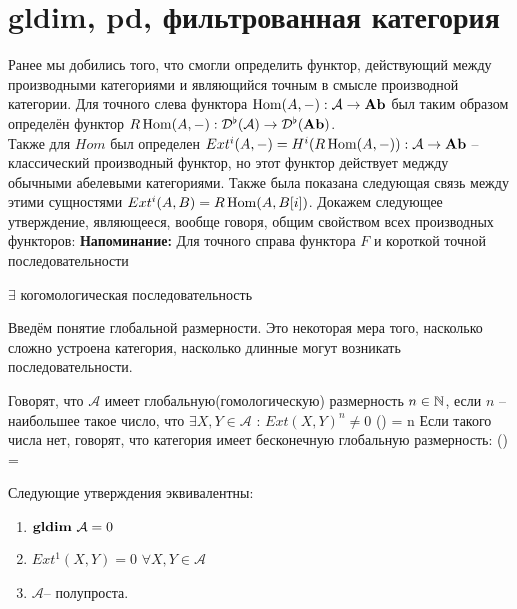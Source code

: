 \documentclass[../main.tex]{subfiles}
\begin{document}
\section{gldim, pd, фильтрованная категория}
Ранее мы добились того, что смогли определить функтор, действующий между производными категориями и являющийся точным в смысле производной категории. 
Для точного слева функтора $\operatorname{Hom}(A, -) : \mathcal{A} \rightarrow \mathbf{Ab}$ был таким образом определён функтор $R\operatorname{Hom}(A, -) : \mathcal{D^\flat (A)} \rightarrow \mathcal{D^\flat (\mathbf{Ab})}$.\\
Также для $Hom$ был определен $Ext^i(A, -) = H^i(R\operatorname{Hom}(A, -)) : \mathcal{A} \rightarrow \mathbf{Ab}$ -- классический производный функтор, но этот функтор действует меджду обычными абелевыми категориями. Также была показана следующая связь между этими сущностями $Ext^i(A, B) = R\operatorname{Hom}(A, B[i])$.
Докажем следующее утверждение, являющееся, вообще говоря, общим свойством всех производных функторов:
\textbf{Напоминание:} Для точного справа функтора $F$ и короткой точной последовательности  $\exists$ когомологическая последовательность 
Введём понятие глобальной размерности. Это некоторая мера того, насколько сложно устроена категория, насколько длинные могут возникать последовательности.
\begin{to_def}
\label{gld}
Говорят, что $\mathcal{A}$ имеет глобальную(гомологическую) размерность $n\in \mathbb{N}$, если $n$ -- наибольшее такое число, что $\exists X, Y \in \mathcal{A}$ : $Ext(X, Y)^n \neq 0$
\bee
{}() = n
\eee
Если такого числа нет, говорят, что категория имеет бесконечную глобальную размерность:
\bee
{}() = \infty
\eee
\end{to_def}
\begin{to_thr}
Следующие утверждения эквивалентны:
\begin{enumerate}
    \item $\mathbf{gldim}\text{ } \mathcal{A} = 0$
    \item $Ext^1(X, Y) = 0$  $\forall X, Y \in \mathcal{A}$
    \item $\mathcal{A}$-- полупроста.
\end{enumerate}
\end{to_thr}
\end{document}
